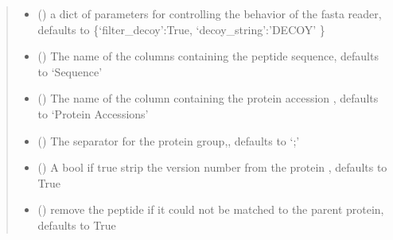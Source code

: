 \documentclass[letterpaper,10pt,english]{sphinxmanual}
\begin{document}
\begin{fulllineitems}
\begin{quote}
\begin{description}
\begin{itemize}
\item {} 
 (\sphinxstyleliteralemphasis{\sphinxupquote{{[}}}\sphinxstyleliteralemphasis{\sphinxupquote{,}}\sphinxstyleliteralemphasis{\sphinxupquote{{]}}}\sphinxstyleliteralemphasis{\sphinxupquote{, }}) \textendash{} a dict of parameters for controlling the behavior of the fasta reader, defaults to \{‘filter\_decoy’:True, ‘decoy\_string’:’DECOY’ \}

\item {} 
 (\sphinxstyleliteralemphasis{\sphinxupquote{, }}) \textendash{} The name of the columns containing the peptide sequence, defaults to ‘Sequence’

\item {} 
 (\sphinxstyleliteralemphasis{\sphinxupquote{, }}) \textendash{} The name of the column containing the protein accession , defaults to ‘Protein Accessions’

\item {} 
 (\sphinxstyleliteralemphasis{\sphinxupquote{, }}) \textendash{} The separator for the protein group,, defaults to ‘;’

\item {} 
 (\sphinxstyleliteralemphasis{\sphinxupquote{, }}) \textendash{} A bool if true strip the version number from the protein , defaults to True

\item {} 
 (\sphinxstyleliteralemphasis{\sphinxupquote{, }}) \textendash{} remove the peptide if it could not be matched to the parent protein, defaults to True


\end{itemize}
\end{description}
\end{quote}
\end{fulllineitems}
\end{document}
